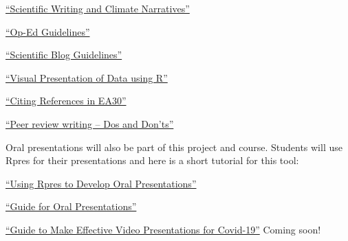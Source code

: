 \documentclass{article}\usepackage[]{graphicx}\usepackage[]{color}
\newenvironment{itemize*}%
  {\begin{itemize}%
    \setlength{\itemsep}{0pt}%
    \setlength{\parskip}{0pt}}%
  {\end{itemize}}
\begin{document}
\begin{itemize*}
  \item \href{https://github.com/marclos/Climate_Change_Narratives/raw/master/Communication_Resources/Writing_About_Climate.pdf}{``Scientific Writing and Climate Narratives''}

  \item \href{https://github.com/marclos/Climate_Change_Narratives/raw/master/Communication_Resources/Op-Ed_Guidelines.pdf}{``Op-Ed Guidelines''}
  
  \item \href{https://github.com/marclos/Climate_Change_Narratives/raw/master/Communication_Resources/Scientific_Blog_Guidelines.pdf}{``Scientific Blog Guidelines''}
  
  \item \href{https://github.com/marclos/Climate_Change_Narratives/raw/master/Communication_Resources/Visualing_Data.pdf}{``Visual Presentation of Data using R''}
  
  \item \href{https://github.com/marclos/Climate_Change_Narratives/raw/master/Communication_Resources/Citing_Sources.pdf}{``Citing References in EA30''}
  
  \item \href{https://github.com/marclos/Climate_Change_Narratives/raw/master/Communication_Resources/Peer_Review-Dos_and_Donts.pdf}{``Peer review writing -- Dos and Don'ts''}
\end{itemize*}

Oral presentations will also be part of this project and course. Students will use Rpres for their presentations and here is a short tutorial for this tool:

\begin{itemize*}
  \item \href{https://github.com/marclos/Climate_Change_Narratives/raw/master/Communication_Resources/TBD.pdf}{``Using Rpres to Develop Oral Presentations''}
  
  \item \href{https://github.com/marclos/Climate_Change_Narratives/raw/master/Communication_Resources/TBD.pdf}{``Guide for Oral Presentations''}
  
  \item \href{https://github.com/marclos/Climate_Change_Narratives/raw/master/Communication_Resources/TBD.pdf}{``Guide to Make Effective Video Presentations for Covid-19''} Coming soon! \smiley{}
\end{itemize*}
\end{document}

